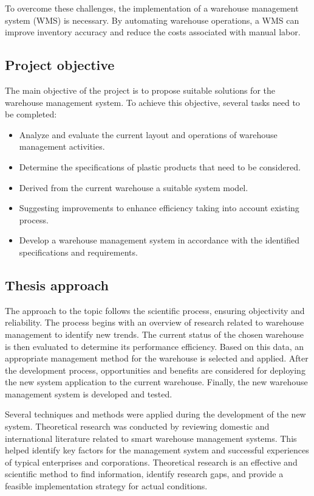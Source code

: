 To overcome these challenges, the implementation of a warehouse management system (WMS) is necessary. By automating warehouse operations, a WMS can improve inventory accuracy and reduce the costs associated with manual labor.

\subsection{Project objective}
The main objective of the project is to propose suitable solutions for the warehouse management system. To achieve this objective, several tasks need to be completed:
        \begin{itemize}
            \begin{itemize}
                \item  Analyze and evaluate the current layout and operations of warehouse \linebreak management activities.
                \item Determine the specifications of plastic products that need to be considered.
                \item Derived from the current warehouse a suitable system model.
                \item Suggesting improvements to enhance efficiency taking into account existing process.
                \item Develop a warehouse management system in accordance with the identified specifications and requirements.
            \end{itemize}
        \end{itemize}

\subsection{Thesis approach}

The approach to the topic follows the scientific process, ensuring objectivity and reliability. The process begins with an overview of research related to warehouse management to identify new trends. The current status of the chosen warehouse is then evaluated to determine its performance efficiency. Based on this data, an appropriate management method for the warehouse is selected and applied. After the development process, opportunities and benefits are considered for deploying the new system application to the current warehouse. Finally, the new warehouse management system is developed and tested.

Several techniques and methods were applied during the development of the new system. Theoretical research was conducted by reviewing domestic and international literature related to smart warehouse management systems. This helped identify key factors for the management system and successful experiences of typical enterprises and corporations. Theoretical research is an effective and scientific method to find information, identify research gaps, and provide a feasible implementation strategy for actual conditions.

